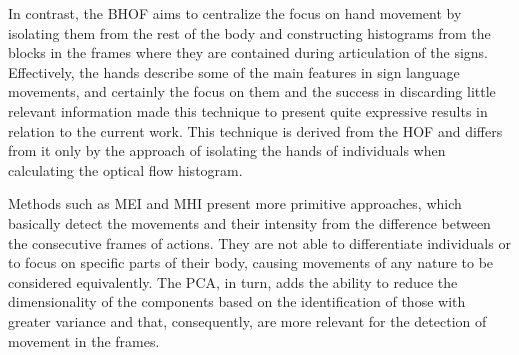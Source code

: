 In contrast, the BHOF \cite{lim-2016} aims to centralize the focus on hand movement by isolating them from the rest of the body and constructing histograms from the blocks in the frames where they are contained during articulation of the signs. Effectively, the hands describe some of the main features in sign language movements, and certainly the focus on them and the success in discarding little relevant information made this technique to present quite expressive results in relation to the current work. This technique is derived from the HOF and differs from it only by the approach of isolating the hands of individuals when calculating the optical flow histogram.



Methods such as MEI and MHI present more primitive approaches, which basically detect the movements and their intensity from the difference between the consecutive frames of actions. They are not able to differentiate individuals or to focus on specific parts of their body, causing movements of any nature to be considered equivalently. The PCA, in turn, adds the ability to reduce the dimensionality of the components based on the identification of those with greater variance and that, consequently, are more relevant for the detection of movement in the frames.


